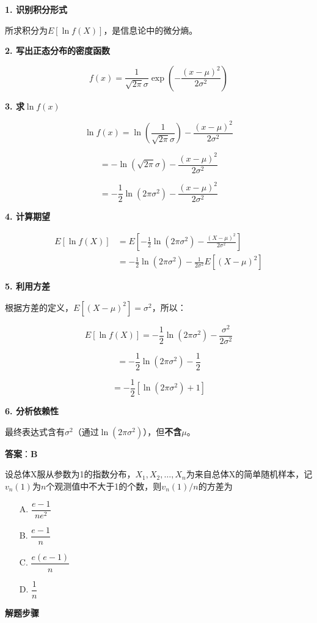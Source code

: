 \documentclass[standard]{ExBook}
\begin{document}
\begin{qitems}
\begin{bbox}
\begin{solution}
            \textbf{1. 识别积分形式}
            
            所求积分为$E[\ln f(X)]$，是信息论中的微分熵。
            
            \textbf{2. 写出正态分布的密度函数}
            
            $$f(x) = \frac{1}{\sqrt{2\pi}\sigma} \exp\left(-\frac{(x-\mu)^2}{2\sigma^2}\right)$$
            
            \textbf{3. 求$\ln f(x)$}
            
            $$\ln f(x) = \ln\left(\frac{1}{\sqrt{2\pi}\sigma}\right) - \frac{(x-\mu)^2}{2\sigma^2}$$
            
            $$= -\ln(\sqrt{2\pi}\sigma) - \frac{(x-\mu)^2}{2\sigma^2}$$
            
            $$= -\frac{1}{2}\ln(2\pi\sigma^2) - \frac{(x-\mu)^2}{2\sigma^2}$$
            
            \textbf{4. 计算期望}
            
            \begin{align*}
            E[\ln f(X)] &= E\left[-\frac{1}{2}\ln(2\pi\sigma^2) - \frac{(X-\mu)^2}{2\sigma^2}\right] \\
            &= -\frac{1}{2}\ln(2\pi\sigma^2) - \frac{1}{2\sigma^2}E[(X-\mu)^2]
            \end{align*}
            
            \textbf{5. 利用方差}
            
            根据方差的定义，$E[(X-\mu)^2] = \sigma^2$，所以：
            
            $$E[\ln f(X)] = -\frac{1}{2}\ln(2\pi\sigma^2) - \frac{\sigma^2}{2\sigma^2}$$
            
            $$= -\frac{1}{2}\ln(2\pi\sigma^2) - \frac{1}{2}$$
            
            $$= -\frac{1}{2}[\ln(2\pi\sigma^2) + 1]$$
            
            \textbf{6. 分析依赖性}
            
            最终表达式含有$\sigma^2$（通过$\ln(2\pi\sigma^2)$），但\textbf{不含$\mu$}。
            
            \textbf{答案}：\textbf{B}
        \end{solution}
    \end{bbox}

    \begin{bbox}
        \qitem 设总体X服从参数为1的指数分布，$X_1, X_2, \dots, X_n$为来自总体X的简单随机样本，记$v_n(1)$为$n$个观测值中不大于1的个数，则$v_n(1)/n$的方差为
        \begin{itemize}
            \item[A.] $\dfrac{e-1}{ne^2}$
            \item[B.] $\dfrac{e-1}{n}$
            \item[C.] $\dfrac{e(e-1)}{n}$
            \item[D.] $\dfrac{1}{n}$
        \end{itemize}
        \begin{solution}
            \textbf{解题步骤}
            

\end{solution}
\end{bbox}
\end{qitems}
\end{document}
